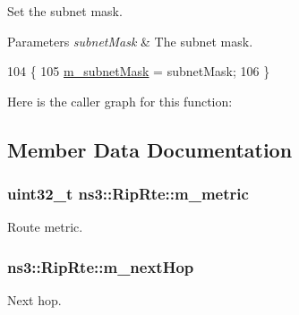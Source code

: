 Set the subnet mask. 


\begin{DoxyParams}{Parameters}
{\em subnet\+Mask} & The subnet mask. \\
\hline
\end{DoxyParams}

\begin{DoxyCode}
104 \{
105   \hyperlink{classns3_1_1RipRte_a18df7fed0765990054dfb50c13d45ecf}{m\_subnetMask} = subnetMask;
106 \}
\end{DoxyCode}


Here is the caller graph for this function\+:




\subsection{Member Data Documentation}
\subsubsection[{\texorpdfstring{m\+\_\+metric}{m_metric}}]{\setlength{\rightskip}{0pt plus 5cm}uint32\+\_\+t ns3\+::\+Rip\+Rte\+::m\+\_\+metric\hspace{0.3cm}{\ttfamily [private]}}\hypertarget{classns3_1_1RipRte_a15971fca4104f1b10985202014a90895}{}\label{classns3_1_1RipRte_a15971fca4104f1b10985202014a90895}


Route metric. 

\subsubsection[{\texorpdfstring{m\+\_\+next\+Hop}{m_nextHop}}]{ ns3\+::\+Rip\+Rte\+::m\+\_\+next\+Hop\hspace{0.3cm}{\ttfamily [private]}}\hypertarget{classns3_1_1RipRte_acfd889bde12da51327722f07a501bcb9}{}\label{classns3_1_1RipRte_acfd889bde12da51327722f07a501bcb9}


Next hop. 

